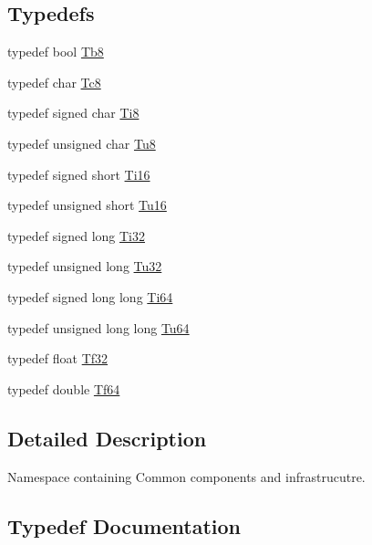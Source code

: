 \subsection*{Typedefs}
\begin{DoxyCompactItemize}
\item 
typedef bool \mbox{\hyperlink{namespace_g_n_common_a8115dc7ed53b6e5b52e6bfde1632ea74}{Tb8}}
\item 
typedef char \mbox{\hyperlink{namespace_g_n_common_a2d8d4c56e54519697c6ee80cc1ceda76}{Tc8}}
\item 
typedef signed char \mbox{\hyperlink{namespace_g_n_common_a9bac2aa36db6d72a3e59b1869adf3668}{Ti8}}
\item 
typedef unsigned char \mbox{\hyperlink{namespace_g_n_common_a7939e251ddbf5d3a31832dcfdc8bde39}{Tu8}}
\item 
typedef signed short \mbox{\hyperlink{namespace_g_n_common_ab9a9a6aa84751cec965d8b6676318a65}{Ti16}}
\item 
typedef unsigned short \mbox{\hyperlink{namespace_g_n_common_a7f651a58155939d1e0e2bf2164fbfdbf}{Tu16}}
\item 
typedef signed long \mbox{\hyperlink{namespace_g_n_common_ad1f094ce51908947ac3d31355b560d55}{Ti32}}
\item 
typedef unsigned long \mbox{\hyperlink{namespace_g_n_common_a941b527ef318f318aed7903dc832b7e4}{Tu32}}
\item 
typedef signed long long \mbox{\hyperlink{namespace_g_n_common_ad0a34f67eefe81cfbd0e515bba246d9d}{Ti64}}
\item 
typedef unsigned long long \mbox{\hyperlink{namespace_g_n_common_a9404ee6090c788ae70aebd1436ceb97d}{Tu64}}
\item 
typedef float \mbox{\hyperlink{namespace_g_n_common_ae4ffdde6236eb7578669b280a5d1634d}{Tf32}}
\item 
typedef double \mbox{\hyperlink{namespace_g_n_common_a73af96f1663fd8fc5741bcbc5b1427e4}{Tf64}}
\end{DoxyCompactItemize}


\subsection{Detailed Description}
Namespace containing Common components and infrastrucutre. 

\subsection{Typedef Documentation}
\mbox{\label{namespace_g_n_common_a8115dc7ed53b6e5b52e6bfde1632ea74}} 

